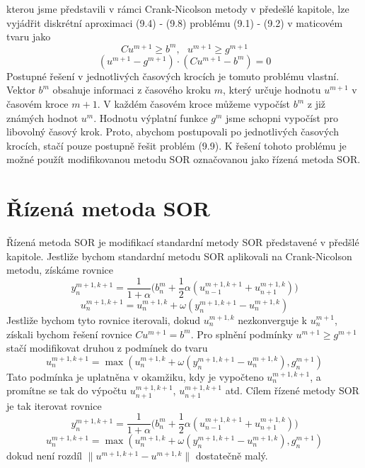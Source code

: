\documentclass[a4paper]{book}
\begin{document}
kterou jsme představili v rámci Crank-Nicolson metody v předešlé kapitole, lze vyjádřit diskrétní aproximaci (9.4) - (9.8) problému (9.1) - (9.2) v maticovém tvaru jako
\begin{equation*}
Cu^{m+1} \ge b^m, ~~~ u^{m+1} \ge g^{m+1}
\end{equation*}
\begin{equation}
(u^{m+1} - g^{m+1}) \cdot (Cu^{m+1} - b^m) = 0
\end{equation}
Postupné řešení v jednotlivých časových krocích je tomuto problému vlastní. Vektor $b^m$ obsahuje informaci z časového kroku $m$, který určuje hodnotu $u^{m+1}$ v časovém kroce $m+1$. V každém časovém kroce můžeme vypočíst $b^m$ z již známých hodnot $u^m$. Hodnotu výplatní funkce $g^m$ jsme schopni vypočíst pro libovolný časový krok. Proto, abychom postupovali po jednotlivých časových krocích, stačí pouze postupně řešit problém (9.9). K řešení tohoto problému je možné použít modifikovanou metodu SOR označovanou jako řízená metoda SOR.

\section{Řízená metoda SOR}

Řízená metoda SOR je modifikací standardní metody SOR představené v předšlé kapitole. Jestliže bychom standardní metodu SOR aplikovali na Crank-Nicolson metodu, získáme rovnice
\begin{equation*}
y_n^{m+1, k+1} = \frac{1}{1 + \alpha} \Big( b_n^m + \frac{1}{2} \alpha (u_{n-1}^{m+1, k+1} + u_{n+1}^{m+1, k}) \Big)
\end{equation*}
\begin{equation*}
u_n^{m+1, k+1} = u_n^{m+1, k} + \omega(y_n^{m+1, k+1} - u_n^{m+1, k})
\end{equation*}
Jestliže bychom tyto rovnice iterovali, dokud $u_n^{m+1,k}$ nezkonverguje k $u_n^{m+1}$, získali bychom řešení rovnice $Cu^{m+1} = b^m$. Pro splnění podmínky $u^{m+1} \ge g^{m+1}$ stačí modifikovat druhou z podmínek do tvaru
\begin{equation*}
u_n^{m+1, k+1} = \max (u_n^{m+1, k} + \omega(y_n^{m+1, k+1} - u_n^{m+1, k}), g_n^{m+1})
\end{equation*}
Tato podmínka je uplatněna v okamžiku, kdy je vypočteno $u_n^{m+1, k+1}$, a promítne se tak do výpočtu $u_{n+1}^{m+1, k+1}$, $u_{n+1}^{m+1, k+1}$ atd. Cílem řízené metody SOR je tak iterovat rovnice
\begin{equation*}
y_n^{m+1, k+1} = \frac{1}{1 + \alpha} \Big( b_n^m + \frac{1}{2} \alpha (u_{n-1}^{m+1, k+1} + u_{n+1}^{m+1, k}) \Big)
\end{equation*}
\begin{equation}
u_n^{m+1, k+1} = \max (u_n^{m+1, k} + \omega(y_n^{m+1, k+1} - u_n^{m+1, k}), g_n^{m+1})
\end{equation}
dokud není rozdíl $\| u^{m+1, k+1} - u^{m+1,k} \|$ dostatečně malý.
\end{document}
